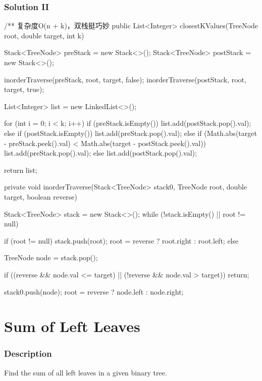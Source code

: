 \newpage

\subsubsection{Solution II}

\begin{Code}
/** 复杂度O(n + k)，双栈挺巧妙
public List<Integer> closestKValues(TreeNode root, double target, int k) {
    Stack<TreeNode> preStack = new Stack<>();
    Stack<TreeNode> postStack = new Stack<>();

    inorderTraverse(preStack, root, target, false);
    inorderTraverse(postStack, root, target, true);

    List<Integer> list = new LinkedList<>();

    for (int i = 0; i < k; i++) {
        if (preStack.isEmpty()) {
            list.add(postStack.pop().val);
        } else if (postStack.isEmpty()) {
            list.add(preStack.pop().val);
        } else if (Math.abs(target - preStack.peek().val) < Math.abs(target - postStack.peek().val)) {
            list.add(preStack.pop().val);
        } else {
            list.add(postStack.pop().val);
        }
    }

    return list;
}

private void inorderTraverse(Stack<TreeNode> stack0, TreeNode root, double target, boolean reverse) {
    Stack<TreeNode> stack = new Stack<>();
    while (!stack.isEmpty() || root != null) {
        if (root != null) {
            stack.push(root);
            root = reverse ? root.right : root.left;
        } else {
            TreeNode node = stack.pop();

            if ((reverse && node.val <= target) || (!reverse && node.val > target)) {
                return;
            }

            stack0.push(node);
            root = reverse ? node.left : node.right;
        }
    }
}
\end{Code}

\newpage

\section{Sum of Left Leaves} %

\subsubsection{Description}
Find the sum of all left leaves in a given binary tree.

